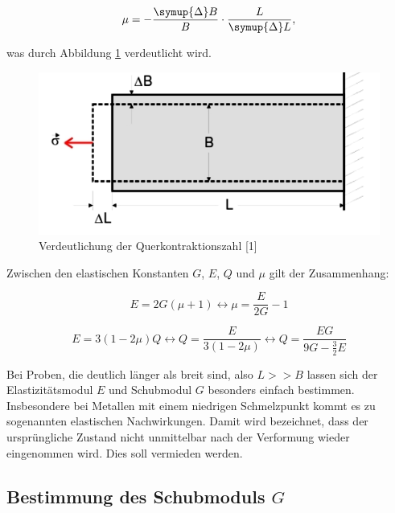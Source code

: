 \begin{equation*}
\mu = -\frac{\symup{\Delta}B}{B}\cdot \frac{L}{\symup{\Delta}L},
\end{equation*}

was durch Abbildung \ref{fig:Mu} verdeutlicht wird. 


\begin{figure}
  \centering
  \includegraphics[scale=0.3]{content/Mu.png}
  \caption{Verdeutlichung der Querkontraktionszahl [1]}
  \label{fig:Mu}
\end{figure}

Zwischen den elastischen Konstanten $G$, $E$, $Q$ und $\mu$ gilt
der Zusammenhang: 

\begin{equation}
E = 2G(\mu +1) \leftrightarrow \mu = \frac{E}{2G} - 1
\end{equation}

\begin{equation}
E = 3(1-2\mu)Q \leftrightarrow Q = \frac{E}{3(1-2\mu)} \leftrightarrow Q = \frac{EG}{9G-\frac{3}{2}E}
\end{equation}

Bei Proben, die deutlich länger als breit sind, also $L>>B$ lassen sich der 
Elastizitätsmodul $E$ und Schubmodul $G$ besonders einfach bestimmen. Insbesondere
bei Metallen mit einem niedrigen Schmelzpunkt kommt es zu sogenannten 
elastischen Nachwirkungen. Damit wird bezeichnet, dass der ursprüngliche 
Zustand nicht unmittelbar nach der Verformung wieder eingenommen wird. 
Dies soll vermieden werden. 

\subsection{Bestimmung des Schubmoduls $G$}

